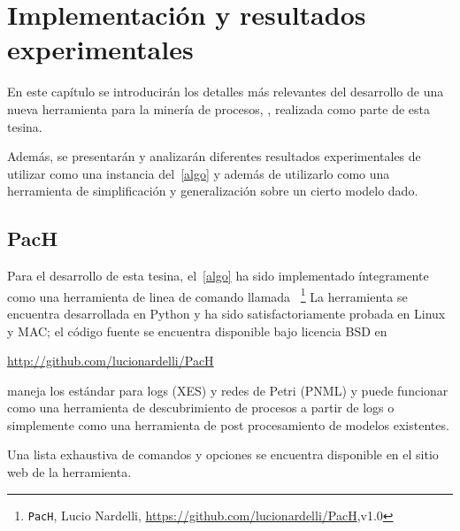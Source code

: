 \chapter[Implementación y resultados experimentales ]{Implementación y resultados experimentales}
\label{chap:4}

En este capítulo se introducirán los detalles más relevantes del desarrollo de una nueva
herramienta para la minería de procesos, \pachtool, realizada como parte de esta tesina. 

Además, se presentarán y analizarán diferentes resultados experimentales 
de utilizar \pachtool como una instancia del~\autoref{algo} y además
de utilizarlo como una herramienta de
simplificación y generalización sobre un cierto modelo dado. 

\section{PacH}
\label{sec:4.pach}

Para el desarrollo de esta tesina, el~\autoref{algo} ha sido implementado íntegramente 
como una herramienta de linea de comando llamada \pachtool~\footnote{\texttt{PacH}, Lucio Nardelli, \url{https://github.com/lucionardelli/PacH},v1.0}
La herramienta se encuentra desarrollada en Python y ha sido satisfactoriamente probada en Linux y MAC;
el código fuente se encuentra disponible bajo licencia BSD en
\begin{center}\url{http://github.com/lucionardelli/PacH}\end{center}

\pachtool maneja los estándar para logs (XES) y redes de Petri (PNML) y puede funcionar como 
una herramienta de descubrimiento de procesos a partir de logs o simplemente como una herramienta 
de post procesamiento de modelos existentes.

Una lista exhaustiva de comandos y opciones se encuentra disponible en el sitio web de la herramienta.

%

